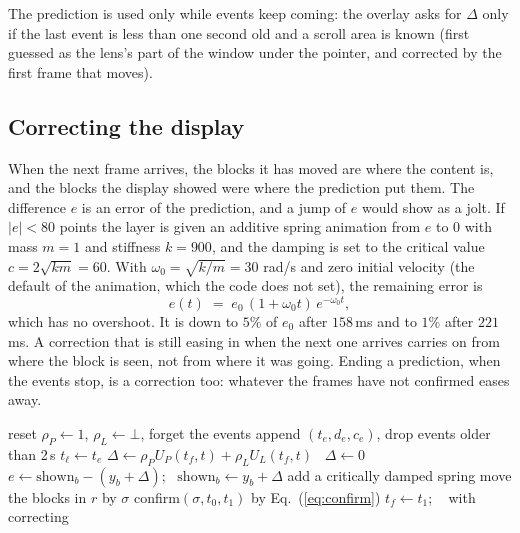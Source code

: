 The prediction is used only while events keep coming: the overlay asks for $\Delta$ only if the last event is less than
one second old and a scroll area is known (first guessed as the lens's part of the window under the pointer, and
corrected by the first frame that moves).

\subsection{Correcting the display}

When the next frame arrives, the blocks it has moved are where the content is, and the blocks the display showed were where the
prediction put them. The difference $e$ is an error of the prediction, and a jump of $e$ would show as a jolt. If $|e|<80$ points the layer
is given an additive spring animation from $e$ to $0$ with mass $m=1$ and stiffness $k=900$, and the damping is set to the critical value
$c=2\sqrt{km}=60$. With $\omega_0=\sqrt{k/m}=30$ rad/s and zero initial velocity (the default of the animation, which the code does not
set), the remaining error is
\begin{equation}\label{eq:spring}
e(t)\;=\;e_0\,(1+\omega_0t)\,e^{-\omega_0t},
\end{equation}
which has no overshoot. It is down to $5\%$ of $e_0$ after $158$\,ms and to $1\%$ after $221$\,ms. A correction that is still easing in when
the next one arrives carries on from where the block is seen, not from where it was going. Ending a prediction, when the events stop, is a correction too:
whatever the frames have not confirmed eases away.

\begin{algorithm}[t]
\caption{Predict and correct, per lens.}\label{alg:predict}
\begin{algorithmic}[1]
   \State reset $\rho_P\gets1$, $\rho_L\gets\bot$, forget the events \EndIf
  \State append $(t_e,d_e,c_e)$, drop events older than 2\,s
  \State $t_\ell\gets t_e$
\EndProcedure
{}
   \State $\Delta\gets\rho_PU_P(t_f,t)+\rho_LU_L(t_f,t)$
  \Else\ \State $\Delta\gets0$ \EndIf
    \State $e\gets\mathrm{shown}_b-(y_b+\Delta)$; \ $\mathrm{shown}_b\gets y_b+\Delta$
     \State add a critically damped spring \EndIf
  \EndFor
\EndProcedure
{}
    \State move the blocks in $r$ by $\sigma$
     \State confirm$(\sigma,t_0,t_1)$ by Eq.~(\ref{eq:confirm}) \EndIf
  \EndFor
  \State $t_f\gets t_1$; \  with correcting
\EndProcedure
\end{algorithmic}
\end{algorithm}

